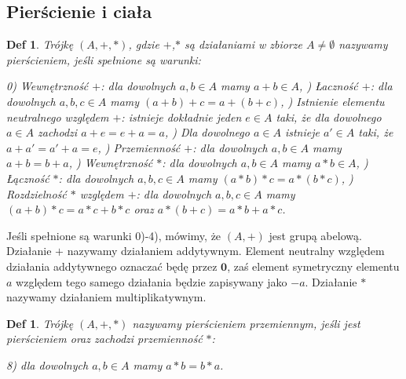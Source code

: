 \documentclass[12pt,a4paper]{article}
\newtheorem{definition}[twr]{Def}
\numberwithin{equation}{section}
\begin{document}
\subsection{Pierścienie i ciała}

\begin{definition} \normalfont
 Trójkę $(A,+,*)$, gdzie $+$,$*$ są działaniami w zbiorze $A \neq \emptyset$ nazywamy pierścieniem, jeśli spełnione są warunki:
    \begin{flushleft}
     0)\:
        Wewnętrzność $+$: dla dowolnych $a,b \in A$ mamy $a+b \in A$, )\:
     	Łaczność $+$: dla dowolnych $a,b,c \in A$ mamy $(a+b)+c=a+(b+c)$, )\:
     Istnienie elementu neutralnego względem $+$: istnieje dokładnie jeden $e \in A $ taki, że dla dowolnego $a \in A$ zachodzi $a+e=e+a=a$, )\:
     Dla dowolnego $a\in A $ istnieje $a' \in A$ taki, że $a+a'=a'+a=e$, )\:
    Przemienność $+$: dla dowolnych $a,b \in A$ mamy $a+b=b+a$, )\:
     Wewnętrzność $*$: dla dowolnych $a,b \in A$ mamy $a*b \in A$, )\:
     Łączność $*$: dla dowolnych $a,b,c \in A$ mamy $(a*b)*c=a*(b*c)$, )\:
     Rozdzielność $*$ względem $+$: dla dowolnych $a,b,c \in A$ mamy $(a+b)*c=a*c+b*c$ oraz $a*(b+c)=a*b+a*c$.
    \end{flushleft}
\end{definition}

Jeśli spełnione są warunki 0)-4), mówimy, że $(A,+)$ jest grupą abelową. 
\\\indent
Działanie $+$ nazywamy działaniem addytywnym. Element neutralny względem działania addytywnego oznaczać będę przez $\textbf{0}$, zaś element symetryczny elementu $a$ względem tego samego działania będzie zapisywany jako $-a$.
Działanie $*$ nazywamy działaniem multiplikatywnym. 

\begin{definition} \normalfont
 Trójkę $(A,+,*)$ nazywamy pierścieniem przemiennym, jeśli jest pierścieniem oraz zachodzi przemienność $*$:
    \begin{flushleft}
  8)\:  dla dowolnych $a,b \in A$ mamy $a*b=b*a$.
    \end{flushleft}
\end{definition}
\end{document}
